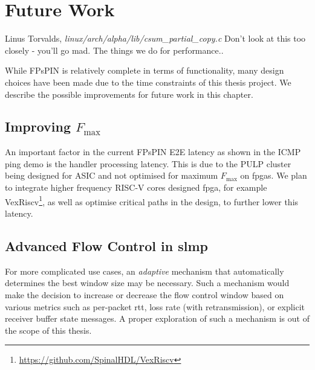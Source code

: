 \chapter{Future Work}
\begin{chapquote}{Linus Torvalds, \emph{linux/arch/alpha/lib/csum\_partial\_copy.c}}
Don't look at this too closely - you'll go mad.  The things we do for performance..
\end{chapquote}

While FPsPIN is relatively complete in terms of functionality, many design choices have been made due to the time constraints of this thesis project.  We describe the possible improvements for future work in this chapter.

\section{Improving $F_{\text{max}}$} \label{sec:improving-fmax}

An important factor in the current FPsPIN E2E latency as shown in the ICMP ping demo is the handler processing latency.  This is due to the PULP cluster being designed for ASIC and not optimised for maximum $F_{\text{max}}$ on \ac{fpga}s.  We plan to integrate higher frequency RISC-V cores designed \ac{fpga}, for example VexRiscv\footnote{\url{https://github.com/SpinalHDL/VexRiscv}}, as well as optimise critical paths in the design, to further lower this latency.



\section{Advanced Flow Control in \acs{slmp}} \label{sec:slmp-fc-future-work}

For more complicated use cases, an \emph{adaptive} mechanism that automatically determines the best window size may be necessary.  Such a mechanism would make the decision to increase or decrease the flow control window based on various metrics such as per-packet \ac{rtt}, loss rate (with retransmission), or explicit receiver buffer state messages.  A proper exploration of such a mechanism is out of the scope of this thesis.


